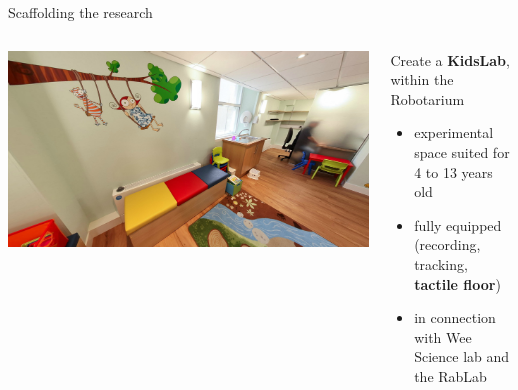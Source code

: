 \documentclass[xcolor=table]{beamer}
\begin{document}
\begin{frame}{Scaffolding the research}

    \begin{columns}
        \begin{column}{0.4\linewidth}
            \begin{center}
                \includegraphics[width=\linewidth]{edinburgh/rablab}
                \vspace{2em}

            \end{center}
        \end{column}
        \begin{column}{0.6\linewidth}

            Create a \textbf{KidsLab}, within the Robotarium
                \begin{itemize}
                    \item experimental space suited for 4 to 13 years old
                    \item fully equipped (recording, tracking, \textbf{tactile
                        floor})
                    \item in connection with Wee Science lab and the RabLab
                \end{itemize}


\end{column}
\end{columns}
\end{frame}
\end{document}
